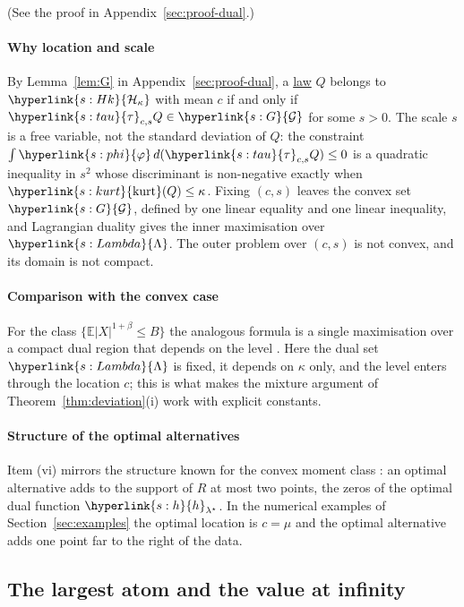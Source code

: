 \documentclass[11pt]{article}
\newcommand{\E}{\mathbb{E}}
\newcommand{\sy}[2]{{\hyperlink{#1}{#2}}}
\newcommand{\term}[2]{\hyperlink{#1}{#2}}
\newcommand{\kurt}{\sy{s:kurt}{\mathrm{kurt}}}
\newcommand{\Hk}{\sy{s:Hk}{\mathcal{H}_{\kappa}}}
\newcommand{\phik}{\sy{s:phi}{\varphi}}
\newcommand{\Gk}{\sy{s:G}{\mathcal{G}}}
\newcommand{\tauc}{\sy{s:tau}{\tau}}
\newcommand{\hl}{\sy{s:h}{h}}
\newcommand{\Lam}{\sy{s:Lambda}{\Lambda}}
\begin{document}
(See the proof in Appendix~\ref{sec:proof-dual}.)

\paragraph{Why location and scale} By Lemma~\ref{lem:G} in Appendix~\ref{sec:proof-dual}, a \term{w:law}{law} $Q$ belongs to
$\Hk$ with mean $c$ if and only if $\tauc_{c,s}Q\in\Gk$ for some $s>0$. The scale $s$ is a free variable,
not the standard deviation of $Q$: the constraint $\int\phik\,d(\tauc_{c,s}Q)\le0$ is a quadratic inequality
in $s^2$ whose discriminant is non-negative exactly when $\kurt(Q)\le\kappa$. Fixing $(c,s)$ leaves the convex
set $\Gk$, defined by one linear equality and one linear inequality, and Lagrangian duality gives the
inner maximisation over $\Lam$. The outer problem over $(c,s)$ is not convex, and its domain is not
compact.

\paragraph{Comparison with the convex case} For the class $\{\E|X|^{1+\beta}\le B\}$ the analogous formula is a
single maximisation over a compact dual region that depends on the level \citep[Lemma~7]{AJK21}. Here the
dual set $\Lam$ is fixed, it depends on $\kappa$ only, and the level enters through the location $c$; this is
what makes the mixture argument of Theorem~\ref{thm:deviation}(i) work with explicit constants.

\paragraph{Structure of the optimal alternatives} Item (vi) mirrors the structure known for the convex
moment class \citep[Lemma~7]{AJK21}: an optimal alternative adds to the support of $R$ at most two points,
the zeros of the optimal dual function $\hl_{\lambda^\star}$. In the numerical examples of
Section~\ref{sec:examples} the optimal location is $c=\mu$ and the optimal alternative adds one point far to
the right of the data.

\subsection{The largest atom and the value at infinity}
\end{document}
